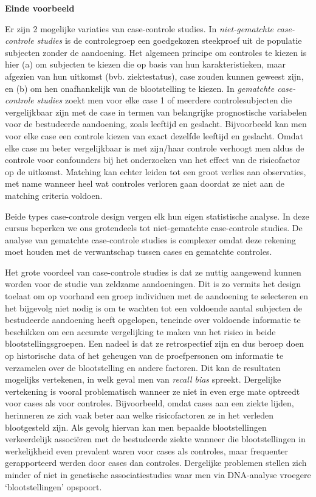 \documentclass[
  12pt,dutch,coursenotes]{book}
\theoremstyle{definition}
\theoremstyle{definition}
\theoremstyle{definition}
\theoremstyle{remark}
\begin{document}
\textbf{Einde voorbeeld}

Er zijn 2 mogelijke variaties van case-controle studies. In \emph{niet-gematchte case-controle studies} is de controlegroep een goedgekozen
steekproef uit de populatie subjecten zonder de
aandoening. Het algemeen principe om controles te kiezen is hier (a) om
subjecten te kiezen die op basis van hun karakteristieken,
maar afgezien van hun uitkomst (bvb. ziektestatus), case zouden kunnen
geweest zijn, en (b) om hen onafhankelijk van de blootstelling te kiezen. In
\emph{gematchte case-controle studies} zoekt men voor elke case 1 of
meerdere controlesubjecten die vergelijkbaar zijn met de case in termen van
belangrijke prognostische variabelen voor de bestudeerde aandoening, zoals
leeftijd en geslacht. Bijvoorbeeld kan men voor elke case een controle
kiezen van exact dezelfde leeftijd en geslacht. Omdat elke case nu beter
vergelijkbaar is met zijn/haar controle verhoogt men aldus de controle voor
confounders bij het onderzoeken van het effect van de risicofactor op de
uitkomst. Matching kan echter leiden tot een groot verlies aan observaties,
met name wanneer heel wat controles verloren gaan doordat ze niet aan de
matching criteria voldoen.

Beide types case-controle design vergen elk hun eigen statistische analyse.
In deze cursus beperken we ons grotendeels tot niet-gematchte case-controle studies. De
analyse van gematchte case-controle studies is complexer omdat deze rekening
moet houden met de verwantschap tussen cases en gematchte controles.

Het grote voordeel van case-controle studies is dat ze nuttig aangewend
kunnen worden voor de studie van zeldzame aandoeningen. Dit is zo vermits
het design toelaat om op voorhand een groep individuen met de aandoening te
selecteren en het bijgevolg niet nodig is om te wachten tot een voldoende
aantal subjecten de bestudeerde aandoening heeft opgelopen, teneinde over voldoende informatie te beschikken om een accurate vergelijking te maken van het risico in beide blootstellingsgroepen. Een nadeel is
dat ze retrospectief zijn en dus beroep doen op historische data of het
geheugen van de proefpersonen om informatie te verzamelen over de
blootstelling en andere factoren. Dit kan de resultaten mogelijks
vertekenen, in welk geval men van \emph{recall bias} spreekt. Dergelijke
vertekening is vooral problematisch wanneer ze niet in even erge mate
optreedt voor cases als voor controles. Bijvoorbeeld, omdat cases aan een
ziekte lijden, herinneren ze zich vaak beter aan welke risicofactoren ze in
het verleden blootgesteld zijn. Als gevolg hiervan kan men bepaalde
blootstellingen verkeerdelijk associëren met de bestudeerde ziekte wanneer
die blootstellingen in werkelijkheid even prevalent waren voor cases als
controles, maar frequenter gerapporteerd werden door cases dan controles. Dergelijke problemen stellen zich minder of niet in genetische associatiestudies waar men via DNA-analyse vroegere `blootstellingen' opspoort.
\end{document}
